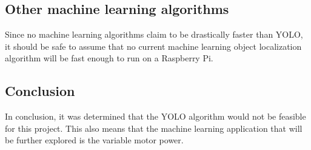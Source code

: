 \subsection{Other machine learning algorithms}
Since no machine learning algorithms claim to be drastically faster than YOLO, it should be safe to assume that no current machine learning object localization algorithm will be fast enough to run on a Raspberry Pi.


\subsection{Conclusion}
In conclusion, it was determined that the YOLO algorithm would not be feasible for this project.
This also means that the machine learning application that will be further explored is the variable motor power.
